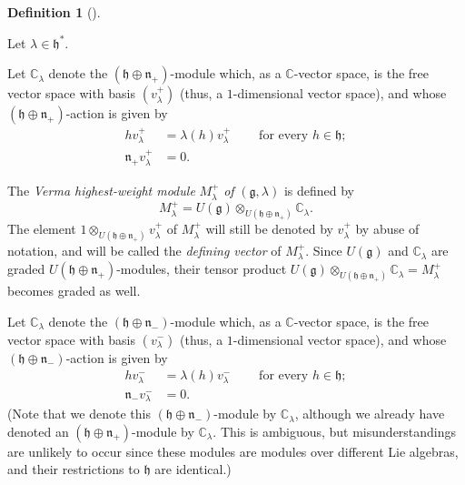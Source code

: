 \documentclass
[numbers=enddot,12pt,final,onecolumn,german,notitlepage]{scrartcl}%
\theoremstyle{definition}
\newtheorem{defi}[theo]{Definition}
\newenvironment{definition}[1][]
{\begin{defi}[#1]\begin{leftbar}}
{\end{leftbar}\end{defi}}
\begin{document}
\begin{definition}
\label{def.verma}Let $\lambda\in\mathfrak{h}^{\ast}$.

Let $\mathbb{C}_{\lambda}$ denote the $\left(  \mathfrak{h}\oplus
\mathfrak{n}_{+}\right)  $-module which, as a $\mathbb{C}$-vector space, is
the free vector space with basis $\left(  v_{\lambda}^{+}\right)  $ (thus, a
$1$-dimensional vector space), and whose $\left(  \mathfrak{h}\oplus
\mathfrak{n}_{+}\right)  $-action is given by%
\begin{align*}
hv_{\lambda}^{+}  &  =\lambda\left(  h\right)  v_{\lambda}^{+}%
\ \ \ \ \ \ \ \ \ \ \text{for every }h\in\mathfrak{h};\\
\mathfrak{n}_{+}v_{\lambda}^{+}  &  =0.
\end{align*}


The \textit{Verma highest-weight module }$M_{\lambda}^{+}$ \textit{of
}$\left(  \mathfrak{g},\lambda\right)  $ is defined by%
\[
M_{\lambda}^{+}=U\left(  \mathfrak{g}\right)  \otimes_{U\left(  \mathfrak{h}%
\oplus\mathfrak{n}_{+}\right)  }\mathbb{C}_{\lambda}.
\]
The element $1\otimes_{U\left(  \mathfrak{h}\oplus\mathfrak{n}_{+}\right)
}v_{\lambda}^{+}$ of $M_{\lambda}^{+}$ will still be denoted by $v_{\lambda
}^{+}$ by abuse of notation, and will be called the \textit{defining vector}
of $M_{\lambda}^{+}$. Since $U\left(  \mathfrak{g}\right)  $ and
$\mathbb{C}_{\lambda}$ are graded $U\left(  \mathfrak{h}\oplus\mathfrak{n}%
_{+}\right)  $-modules, their tensor product $U\left(  \mathfrak{g}\right)
\otimes_{U\left(  \mathfrak{h}\oplus\mathfrak{n}_{+}\right)  }\mathbb{C}%
_{\lambda}=M_{\lambda}^{+}$ becomes graded as well.

Let $\mathbb{C}_{\lambda}$ denote the $\left(  \mathfrak{h}\oplus
\mathfrak{n}_{-}\right)  $-module which, as a $\mathbb{C}$-vector space, is
the free vector space with basis $\left(  v_{\lambda}^{-}\right)  $ (thus, a
$1$-dimensional vector space), and whose $\left(  \mathfrak{h}\oplus
\mathfrak{n}_{-}\right)  $-action is given by%
\begin{align*}
hv_{\lambda}^{-}  &  =\lambda\left(  h\right)  v_{\lambda}^{-}%
\ \ \ \ \ \ \ \ \ \ \text{for every }h\in\mathfrak{h};\\
\mathfrak{n}_{-}v_{\lambda}^{-}  &  =0.
\end{align*}
(Note that we denote this $\left(  \mathfrak{h}\oplus\mathfrak{n}_{-}\right)
$-module by $\mathbb{C}_{\lambda}$, although we already have denoted an
$\left(  \mathfrak{h}\oplus\mathfrak{n}_{+}\right)  $-module by $\mathbb{C}%
_{\lambda}$. This is ambiguous, but misunderstandings are unlikely to occur
since these modules are modules over different Lie algebras, and their
restrictions to $\mathfrak{h}$ are identical.)


\end{definition}
\end{document}
